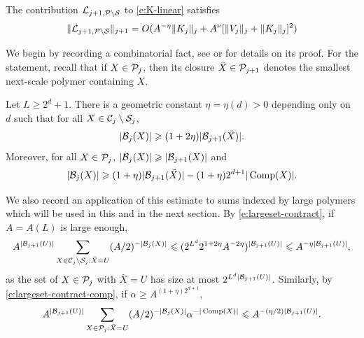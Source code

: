 \documentclass[11pt]{amsart}
\numberwithin{equation}{section}
\numberwithin{theorem}{section}
\newcommand{\1}{{\bf 1}}
\newcommand{\Comp}{\operatorname{Comp}}
\begin{document}
\begin{proposition}
  \label{prop:LargeSetLin}
  The contribution $\mathcal L_{j+1,\mathcal P\setminus\mathcal S}$ to \eqref{e:K-linear} satisfies
  \begin{equation}
  \label{e:LargeSetLin}
  \|\mathcal L_{j+1, \mathcal P \setminus \mathcal S}\|_{j+1} =
  O(  A^{-\eta}\|K_j\|_j+A^\nu[\|V_j\|_j + \|K_j\|_j]^{2})
\end{equation}
\end{proposition}

We begin by recording a combinatorial fact, see \cite[Lemmas~6.15 and 6.16]{MR2523458}
or \cite[Lemma~C.3]{MR3332942} for details on its
proof. For the statement, recall that if $X\in\mathcal P_{j}$, then
its closure $\bar X\in \mathcal P_{j+1}$ denotes the smallest 
next-scale polymer containing $X$.

\begin{lemma}
  \label{lem:comb1}
  Let $L \geq 2^d+1$. 
  There is a geometric constant $\eta=\eta(d)>0$ depending only on $d$ such  that
  for all $X \in \mathcal C_j \setminus \mathcal S_j$,
  \begin{equation} \label{e:largeset-contract} |\mathcal B_{j}(X)| \geqslant
    (1+2\eta) |\mathcal B_{j+1}(\bar X)|.
  \end{equation}
  Moreover, for all $X \in \mathcal P_j$, $|\mathcal B_j(X)| \geqslant |\mathcal B_{j+1}(X)|$ and
  \begin{equation} \label{e:largeset-contract-comp}
    |\cB_j(X)| \geq (1+\eta)|\cB_{j+1}(\bar X)|-(1+\eta)2^{d+1}|\Comp(X)|.
  \end{equation}
\end{lemma}

We also record an application of this estimate to sums indexed by large polymers which will be used in this and in the next section.
By \eqref{e:largeset-contract}, if $A=A(L)$ is large enough,
\begin{equation}
  \label{e:Achoice}
  A^{|\mathcal B_{j+1}(U)|} \sum_{X \in \mathcal C_j\setminus \mathcal S_{j}: \bar X=U} (A/2)^{-|\mathcal B_j(X)|}
  \leqslant (2^{L^d} 2^{1+2\eta}
  A^{-2\eta})^{|\mathcal B_{j+1}(U)|} \leqslant A^{-\eta|\mathcal B_{j+1}(U)|}, 
\end{equation}
as the set of $X\in \mathcal P_j$ 
with $\bar{X}=U$ has
size at most $2^{L^{d}|\mathcal B_{j+1}(U)|}$.
%
Similarly, by \eqref{e:largeset-contract-comp}, if $\alpha \geq
A^{(1+\eta)2^{d +1}}$,
\begin{equation}
  \label{e:Achoice-conn}
  A^{|\cB_{j+1}(U)|} \sum_{X \in \cP_j: \bar X=U} (A/2)^{-|\cB_j(X)|} \alpha^{-|\Comp(X)|}
  \leq A^{-(\eta/2)|\cB_{j+1}(U)|}
  .
\end{equation}
\end{document}
